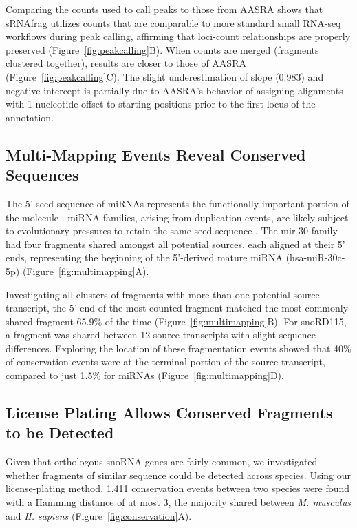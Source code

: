 \documentclass[11pt]{article}
\begin{document}
Comparing the counts used to call peaks to those from AASRA \citep{Xu2021} shows that sRNAfrag utilizes counts that are comparable to more standard small RNA-seq workflows during peak calling, affirming that loci-count relationships are properly preserved (Figure~\ref{fig:peakcalling}B). When counts are merged (fragments clustered together), results are closer to those of AASRA (Figure~\ref{fig:peakcalling}C). The slight underestimation of slope (0.983) and negative intercept is partially due to AASRA's behavior of assigning alignments with 1 nucleotide offset to starting positions prior to the first locus of the annotation.

\subsection{Multi-Mapping Events Reveal Conserved Sequences}

The 5' seed sequence of miRNAs represents the functionally important portion of the molecule \citep{Grimson2007}. miRNA families, arising from duplication events, are likely subject to evolutionary pressures to retain the same seed sequence \citep{Zhang2013}. The mir-30 family had four fragments shared amongst all potential sources, each aligned at their 5' ends, representing the beginning of the 5'-derived mature miRNA (hsa-miR-30c-5p) (Figure~\ref{fig:multimapping}A).

Investigating all clusters of fragments with more than one potential source transcript, the 5' end of the most counted fragment matched the most commonly shared fragment 65.9\% of the time (Figure~\ref{fig:multimapping}B). For snoRD115, a fragment was shared between 12 source transcripts with slight sequence differences. Exploring the location of these fragmentation events showed that 40\% of conservation events were at the terminal portion of the source transcript, compared to just 1.5\% for miRNAs (Figure~\ref{fig:multimapping}D).

\subsection{License Plating Allows Conserved Fragments to be Detected}

Given that orthologous snoRNA genes are fairly common, we investigated whether fragments of similar sequence could be detected across species. Using our license-plating method, 1,411 conservation events between two species were found with a Hamming distance of at most 3, the majority shared between \textit{M. musculus} and \textit{H. sapiens} (Figure~\ref{fig:conservation}A).
\end{document}
